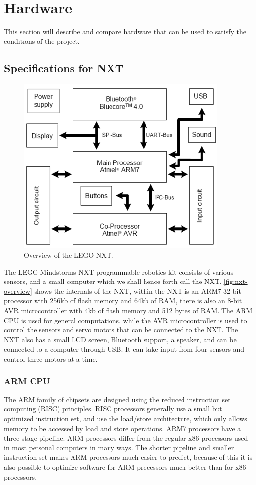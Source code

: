 \section{Hardware}
This section will describe and compare hardware that can be used to satisfy the conditions of the project.

\subsection{Specifications for NXT}

\begin{figure}[hbtp]
\centering
\includegraphics[width=.7\textwidth]{img/lego-nxt-overview.png}
\caption{Overview of the LEGO NXT\cite{nxtspec}.} 
\label{fig:nxt-overview} 
\end{figure}

The LEGO Mindstorms NXT programmable robotics kit consists of various sensors, and a small computer which we shall hence forth call the NXT. \autoref{fig:nxt-overview} shows the internals of the NXT, within the NXT is an ARM7 32-bit processor with 256kb of flash memory and 64kb of RAM, there is also an 8-bit AVR microcontroller with 4kb of flash memory and 512 bytes of RAM\cite{nxtspec}. The ARM CPU is used for general computations, while the AVR microcontroller is used to control the sensors and servo motors that can be connected to the NXT. The NXT also has a small LCD screen, Bluetooth support, a speaker, and can be connected to a computer through USB. It can take input from four sensors and control three motors at a time.

\subsubsection{ARM CPU}
The ARM family of chipsets are designed using the reduced instruction set computing (RISC) principles\cite{armarchitecture}. RISC processors generally use a small but optimized instruction set, and use the load/store architecture, which only allows memory to be accessed by load and store operations. ARM7 processors have a three stage pipeline. ARM processors differ from the regular x86 processors used in most personal computers in many ways. The shorter pipeline and smaller instruction set makes ARM processors much easier to predict, because of this it is also possible to optimize software for ARM processors much better than for x86 processors.

